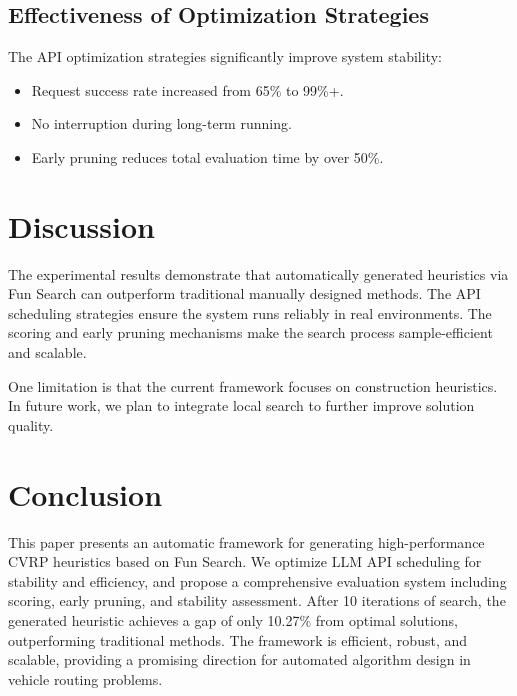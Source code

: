 \documentclass{article}
\begin{document}
\subsection{Effectiveness of Optimization Strategies}

The API optimization strategies significantly improve system stability:
\begin{itemize}
    \item Request success rate increased from 65\% to 99\%+.
    \item No interruption during long-term running.
    \item Early pruning reduces total evaluation time by over 50\%.
\end{itemize}

\section{Discussion}

The experimental results demonstrate that automatically generated heuristics via Fun Search can outperform traditional manually designed methods. The API scheduling strategies ensure the system runs reliably in real environments. The scoring and early pruning mechanisms make the search process sample-efficient and scalable.

One limitation is that the current framework focuses on construction heuristics. In future work, we plan to integrate local search to further improve solution quality.

\section{Conclusion}

This paper presents an automatic framework for generating high-performance CVRP heuristics based on Fun Search. We optimize LLM API scheduling for stability and efficiency, and propose a comprehensive evaluation system including scoring, early pruning, and stability assessment. After 10 iterations of search, the generated heuristic achieves a gap of only 10.27\% from optimal solutions, outperforming traditional methods. The framework is efficient, robust, and scalable, providing a promising direction for automated algorithm design in vehicle routing problems.

\nocite{tosatto2023survey,deep2022review}


\end{document}
